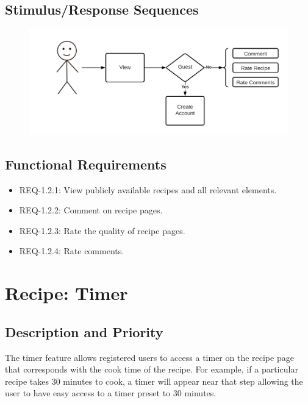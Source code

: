 \documentclass{scrreprt}
\begin{document}
\subsection{Stimulus/Response Sequences}

\begin{figure}[H]\centering
    \includegraphics[width=\columnwidth]{FlowCharts/Recipe-Pages.png}
\end{figure}

\subsection{Functional Requirements}

\begin{itemize}
    \item REQ-1.2.1: View publicly available recipes and all relevant elements.
    \item REQ-1.2.2: Comment on recipe pages.
    \item REQ-1.2.3: Rate the quality of recipe pages.
    \item REQ-1.2.4: Rate comments.
\end{itemize}

\section{Recipe: Timer}

\subsection{Description and Priority}

The timer feature allows registered users to access a timer on the recipe page that corresponds with the cook time of the recipe. For example, if a particular recipe takes 30 minutes to cook, a timer will appear near that step allowing the user to have easy access to a timer preset to 30 minutes.
\end{document}
